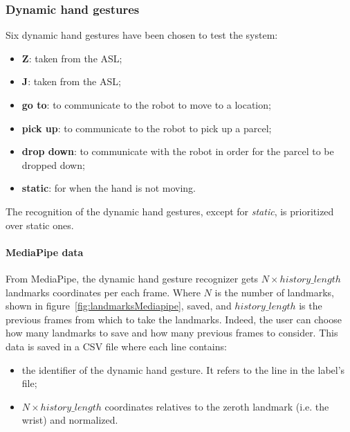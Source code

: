 \documentclass[../thesis.tex]{subfiles}
\begin{document}
\subsubsection{Dynamic hand gestures}
Six dynamic hand gestures have been chosen to test the system:
\begin{itemize}
    \item \textbf{Z}: taken from the \acrshort{ASL};
    \item \textbf{J}: taken from the \acrshort{ASL};
    \item \textbf{go to}: to communicate to the robot to move to a location;
    \item \textbf{pick up}: to communicate to the robot to pick up a parcel;
    \item \textbf{drop down}: to communicate with the robot in order for the parcel to be dropped down;
    \item \textbf{static}: for when the hand is not moving.
\end{itemize}
The recognition of the dynamic hand gestures, except for \textit{static}, is prioritized over static ones.
\paragraph{MediaPipe data}
From MediaPipe, the dynamic hand gesture recognizer gets $N \times history\_length$ landmarks coordinates per each frame. Where $N$ is the number of landmarks, shown in figure~\ref{fig:landmarksMediapipe}, saved, and $history\_length$ is the previous frames from which to take the landmarks. Indeed, the user can choose how many landmarks to save and how many previous frames to consider. This data is saved in a CSV file where each line contains: 
\begin{itemize}
    \item the identifier of the dynamic hand gesture. It refers to the line in the label’s file; 
    \item $N \times history\_length$ coordinates relatives to the zeroth landmark (i.e. the wrist) and normalized.
\end{itemize}
\end{document}

